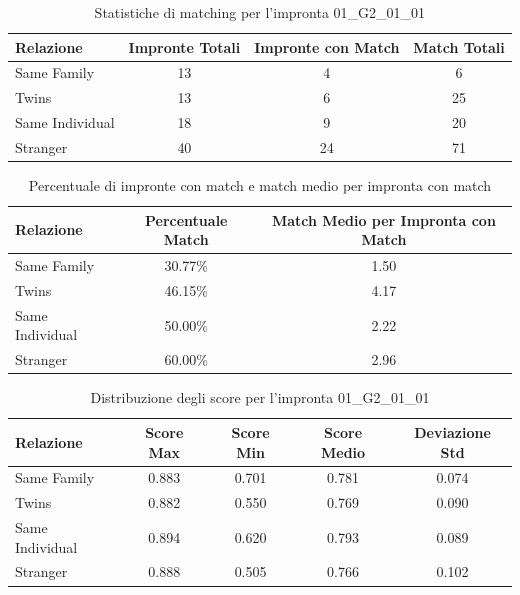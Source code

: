\begin{table}[htbp]
\centering
\caption{Statistiche di matching per l'impronta 01\_G2\_01\_01}
\label{tab:results_01_G2_01_01}
\begin{tabular}{|l|c|c|c|}
\hline
\textbf{Relazione} & \textbf{Impronte Totali} & \textbf{Impronte con Match} & \textbf{Match Totali} \\
\hline
Same Family & 13 & 4 & 6 \\
\hline
Twins & 13 & 6 & 25 \\
\hline
Same Individual & 18 & 9 & 20 \\
\hline
Stranger & 40 & 24 & 71 \\
\hline
\end{tabular}
\end{table}


\begin{table}[htbp]
\centering
\caption{Percentuale di impronte con match e match medio per impronta con match}
\label{tab:match_percentage_01_G2_01_01}
\begin{tabular}{|l|c|c|}
\hline
\textbf{Relazione} & \textbf{Percentuale Match} & \textbf{Match Medio per Impronta con Match} \\
\hline
Same Family & 30.77\% & 1.50 \\
\hline
Twins & 46.15\% & 4.17 \\
\hline
Same Individual & 50.00\% & 2.22 \\
\hline
Stranger & 60.00\% & 2.96 \\
\hline
\end{tabular}
\end{table}


\begin{table}[htbp]
\centering
\caption{Distribuzione degli score per l'impronta 01\_G2\_01\_01}
\label{tab:scores_01_G2_01_01}
\begin{tabular}{|l|c|c|c|c|}
\hline
\textbf{Relazione} & \textbf{Score Max} & \textbf{Score Min} & \textbf{Score Medio} & \textbf{Deviazione Std} \\
\hline
Same Family & 0.883 & 0.701 & 0.781 & 0.074 \\
\hline
Twins & 0.882 & 0.550 & 0.769 & 0.090 \\
\hline
Same Individual & 0.894 & 0.620 & 0.793 & 0.089 \\
\hline
Stranger & 0.888 & 0.505 & 0.766 & 0.102 \\
\hline
\end{tabular}
\end{table}

